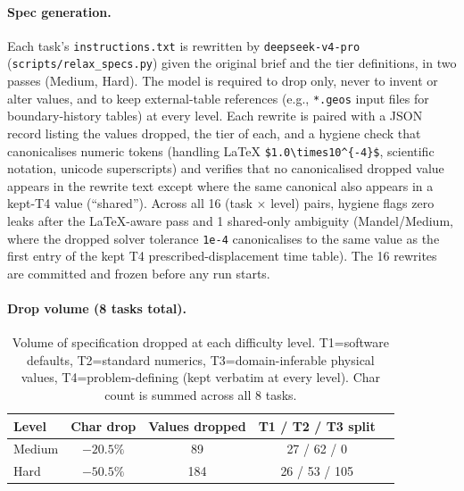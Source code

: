 \documentclass{article}
\begin{document}
\paragraph{Spec generation.} Each task's \texttt{instructions.txt} is rewritten by \texttt{deepseek-v4-pro} (\texttt{scripts/relax\_specs.py}) given the original brief and the tier definitions, in two passes (Medium, Hard). The model is required to drop only, never to invent or alter values, and to keep external-table references (e.g., \texttt{*.geos} input files for boundary-history tables) at every level. Each rewrite is paired with a JSON record listing the values dropped, the tier of each, and a hygiene check that canonicalises numeric tokens (handling LaTeX \texttt{\$1.0\textbackslash times10\^{}\{-4\}\$}, scientific notation, unicode superscripts) and verifies that no canonicalised dropped value appears in the rewrite text except where the same canonical also appears in a kept-T4 value (``shared''). Across all 16 (task $\times$ level) pairs, hygiene flags zero leaks after the LaTeX-aware pass and 1 shared-only ambiguity (Mandel/Medium, where the dropped solver tolerance \texttt{1e-4} canonicalises to the same value as the first entry of the kept T4 prescribed-displacement time table). The 16 rewrites are committed and frozen before any run starts.

\paragraph{Drop volume (8 tasks total).}

\begin{table}[h]
  \caption{Volume of specification dropped at each difficulty level. T1=software defaults, T2=standard numerics, T3=domain-inferable physical values, T4=problem-defining (kept verbatim at every level). Char count is summed across all 8 tasks.}
  \label{tab:autonomy-drop}
  \centering
  \small
  \begin{tabular}{lcccc}
    \toprule
    \textbf{Level} & \textbf{Char drop} & \textbf{Values dropped} & \textbf{T1 / T2 / T3 split} \\
    \midrule
    Medium & $-20.5\%$ & 89  & 27 / 62 / 0 \\
    Hard   & $-50.5\%$ & 184 & 26 / 53 / 105 \\
    \bottomrule
  \end{tabular}
\end{table}
\end{document}
